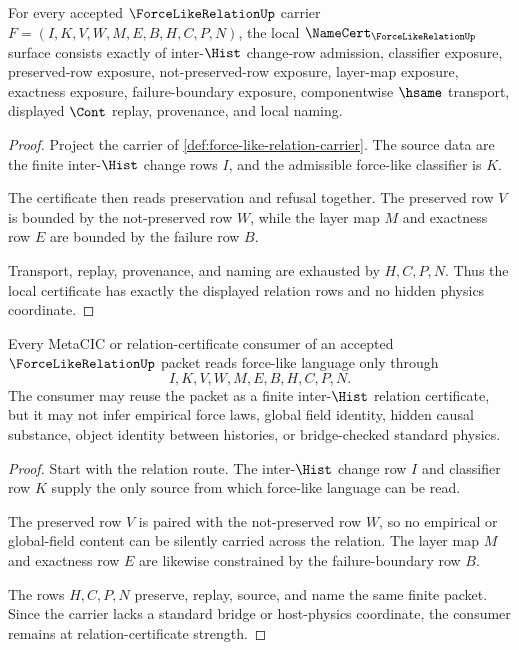 \begin{theorem}
\label{thm:force-like-relation-namecert-obligations}
For every accepted $\ForceLikeRelationUp$ carrier $F=(I,K,V,W,M,E,B,H,C,P,N)$, the local $\NameCert_{\ForceLikeRelationUp}$ surface consists exactly of inter-$\Hist$ change-row admission, classifier exposure, preserved-row exposure, not-preserved-row exposure, layer-map exposure, exactness exposure, failure-boundary exposure, componentwise $\hsame$ transport, displayed $\Cont$ replay, provenance, and local naming.
\end{theorem}
\begin{proof}
Project the carrier of \autoref{def:force-like-relation-carrier}. The source data are the finite inter-$\Hist$ change rows $I$, and the admissible force-like classifier is $K$.

The certificate then reads preservation and refusal together. The preserved row $V$ is bounded by the not-preserved row $W$, while the layer map $M$ and exactness row $E$ are bounded by the failure row $B$.

Transport, replay, provenance, and naming are exhausted by $H,C,P,N$. Thus the local certificate has exactly the displayed relation rows and no hidden physics coordinate.
\end{proof}

\begin{theorem}
\label{thm:force-like-relation-metacic-boundary}
Every MetaCIC or relation-certificate consumer of an accepted $\ForceLikeRelationUp$ packet reads force-like language only through
$$
I,K,V,W,M,E,B,H,C,P,N .
$$
The consumer may reuse the packet as a finite inter-$\Hist$ relation certificate, but it may not infer empirical force laws, global field identity, hidden causal substance, object identity between histories, or bridge-checked standard physics.
\end{theorem}
\begin{proof}
Start with the relation route. The inter-$\Hist$ change row $I$ and classifier row $K$ supply the only source from which force-like language can be read.

The preserved row $V$ is paired with the not-preserved row $W$, so no empirical or global-field content can be silently carried across the relation. The layer map $M$ and exactness row $E$ are likewise constrained by the failure-boundary row $B$.

The rows $H,C,P,N$ preserve, replay, source, and name the same finite packet. Since the carrier lacks a standard bridge or host-physics coordinate, the consumer remains at relation-certificate strength.
\end{proof}

